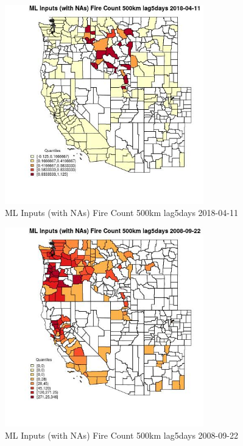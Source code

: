 \begin{figure} 
\centering  
\includegraphics[width=0.77\textwidth]{Code_Outputs/Report_ML_input_PM25_Step4_part_e_de_duplicated_aves_compiled_2019-05-18wNAs_CountyFire_Count_500km_lag5daysMean2018-04-11_2018-04-11.jpg} 
\caption{\label{fig:Report_ML_input_PM25_Step4_part_e_de_duplicated_aves_compiled_2019-05-18wNAsCountyFire_Count_500km_lag5daysMean2018-04-11_2018-04-11}ML Inputs (with NAs) Fire Count 500km lag5days 2018-04-11} 
\end{figure} 
 

\begin{figure} 
\centering  
\includegraphics[width=0.77\textwidth]{Code_Outputs/Report_ML_input_PM25_Step4_part_e_de_duplicated_aves_compiled_2019-05-18wNAs_CountyFire_Count_500km_lag5daysMean2008-09-22_2008-09-22.jpg} 
\caption{\label{fig:Report_ML_input_PM25_Step4_part_e_de_duplicated_aves_compiled_2019-05-18wNAsCountyFire_Count_500km_lag5daysMean2008-09-22_2008-09-22}ML Inputs (with NAs) Fire Count 500km lag5days 2008-09-22} 
\end{figure} 
 

